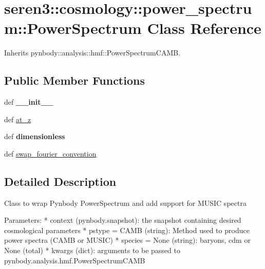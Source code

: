 \hypertarget{classseren3_1_1cosmology_1_1power__spectrum_1_1PowerSpectrum}{
\section{seren3::cosmology::power\_\-spectrum::PowerSpectrum Class Reference}
\label{classseren3_1_1cosmology_1_1power__spectrum_1_1PowerSpectrum}
}


Inherits pynbody::analysis::hmf::PowerSpectrumCAMB.\subsection*{Public Member Functions}
\begin{DoxyCompactItemize}
\item 
\hypertarget{classseren3_1_1cosmology_1_1power__spectrum_1_1PowerSpectrum_a28c5ac63e656207586e3efe55784b174}{
def {\bfseries \_\-\_\-init\_\-\_\-}}
\label{classseren3_1_1cosmology_1_1power__spectrum_1_1PowerSpectrum_a28c5ac63e656207586e3efe55784b174}

\item 
def \hyperlink{classseren3_1_1cosmology_1_1power__spectrum_1_1PowerSpectrum_a86a39b95d4985a9fb82cecd613513024}{at\_\-z}
\item 
\hypertarget{classseren3_1_1cosmology_1_1power__spectrum_1_1PowerSpectrum_ac017a68e32edc7211a008e952966f002}{
def {\bfseries dimensionless}}
\label{classseren3_1_1cosmology_1_1power__spectrum_1_1PowerSpectrum_ac017a68e32edc7211a008e952966f002}

\item 
def \hyperlink{classseren3_1_1cosmology_1_1power__spectrum_1_1PowerSpectrum_a3e2a91cb58acc6f61f7ef4f17025a73c}{swap\_\-fourier\_\-convention}
\end{DoxyCompactItemize}


\subsection{Detailed Description}
\begin{DoxyVerb}
Class to wrap Pynbody PowerSpectrum and add support for MUSIC spectra

Parameters:
        * context (pynbody.snapshot): the snapshot containing desired cosmological parameters
        * pstype = CAMB (string): Method used to produce power spectra (CAMB or MUSIC)
        * species = None (string): baryons, cdm or None (total)
        * kwargs (dict): arguments to be passed to pynbody.analysis.hmf.PowerSpectrumCAMB
\end{DoxyVerb}
 


